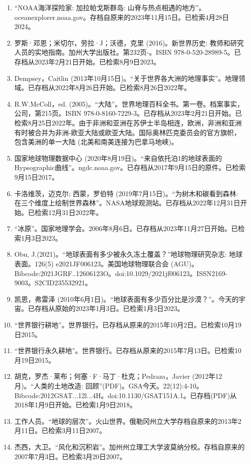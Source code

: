 \begin{enumerate}
\item “NOAA海洋探险家: 加拉帕戈斯群岛: 山脊与热点相遇的地方”。oceanexplorer.noaa.gov。存档自原来的2023年11月15日。已检索4月28日2024。
\item 罗斯·邓恩；米切尔，劳拉·J；沃德，克里 (2016)。新世界历史: 教师和研究人员的实地指南。加州大学出版社。第232页-。ISBN 978-0-520-28989-5。已存档从2023年2月21日开始。已检索8月9日2023。
\item Dempsey，Caitlin (2013年10月15日)。“关于世界各大洲的地理事实”。地理领域。已存档从2022年8月26日开始。已检索8月26日2022年。
\item R.W.McColl，ed. (2005)。“大陆”。世界地理百科全书。第一卷。档案事实，公司，第215页。ISBN 978-0-8160-7229-3。已存档从2023年2月21日开始。已检索8月25日2022年。由于非洲和亚洲在苏伊士半岛相连，欧洲，非洲和亚洲有时被合并为非洲-欧亚大陆或欧亚大陆。国际奥林匹克委员会的官方旗帜，包含美洲的单一大陆 (北美和南美连接为巴拿马地峡)。
\item 国家地球物理数据中心 (2020年8月19日)。“来自依托泊1的地球表面的Hypsographic曲线”。ngdc.noaa.gov。已存档从2017年9月15日的原件。已检索9月15日2017。
\item 卡洛维茨，迈克尔; 西蒙，罗伯特 (2019年7月15日)。“为树木和碳看到森林: 在三个维度上绘制世界森林”。NASA地球观测站。已存档从2022年12月31日开始。已检索12月31日2022年。
\item “冰原”。国家地理学会。2006年8月6日。已存档从2023年11月27日开始。已检索1月3日2023。
\item Obu, J.(2021)。“地球表面有多少被永久冻土覆盖？”地球物理研究杂志: 地球表面。126(5) e2021JF006123。美国地球物理联合会 (AGU)。Bibcode:2021JGRF..12606123O。doi:10.1029/2021jf006123。ISSN2169-9003。S2CID235532921。  
\item 凯恩，弗雷泽 (2010年6月1日)。“地球表面有多少百分比是沙漠？”。今天的宇宙。已存档从原始的2023年1月3日。已检索1月3日2023。
\item “世界银行耕地”。世界银行。已存档从原来的2015年10月2日。已检索10月19日2015。
\item “世界银行永久耕地”。世界银行。已存档从原来的2015年7月13日。已检索10月19日2015。
\item 胡克，罗杰·莱布；何塞·F·马丁·杜克；Pedraza，Javier (2012年12月)。“人类的土地改造: 回顾”(PDF)。GSA今天。22(12):4-10。Bibcode:2012GSAT...12l...4H。doi:10.1130/GSAT151A.1。已存档(PDF)从2018年1月9日开始。已检索1月9日2018。
\item 工作人员。“地球的层次”。火山世界。俄勒冈州立大学存档自原来的2013年2月11日。已检索3月11日2007。
\item 杰西，大卫。“风化和沉积岩”。加州州立理工大学波莫纳分校。存档自原来的2007年7月3日。已检索3月20日2007。

\end{enumerate}

